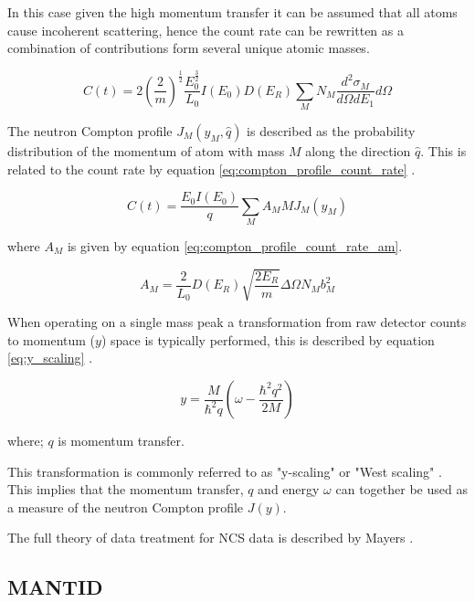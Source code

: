 \documentclass[a4paper]{article}
\begin{document}
In this case given the high momentum transfer it can be assumed that all atoms
cause incoherent scattering, hence the count rate can be rewritten as a
combination of contributions form several unique atomic masses.

\begin{equation}
  \label{eq:countrate_ncs}
  C(t) =
    2\left(\frac{2}{m}\right)^{\frac{1}{2}}
    \frac{E_{0}^{\frac{3}{2}}}{L_{0}}
    I(E_{0}) D(E_{R})
    \sum_{M}
    N_{M} \frac{d^{2}\sigma_{M}}{d\Omega dE_{1}} d\Omega
\end{equation}

The neutron Compton profile $J_{M}(y_{M}, \hat{q})$ is described as the
probability distribution of the momentum of atom with mass $M$ along the
direction $\hat{q}$. This is related to the count rate by equation
\ref{eq:compton_profile_count_rate} \cite{Mayers2010}.

\begin{equation}
  \label{eq:compton_profile_count_rate}
  C(t) =
    \frac{E_{0} I(E_{0})}{q}
    \sum_{M}
    A_{M} M J_{M}(y_{M})
\end{equation}

where $A_{M}$ is given by equation \ref{eq:compton_profile_count_rate_am}.

\begin{equation}
  \label{eq:compton_profile_count_rate_am}
  A_{M} =
    \frac{2}{L_{0}} D(E_{R})
    \sqrt{\frac{2E_{R}}{m}}
    \Delta \Omega N_{M} b_{M}^{2}
\end{equation}

When operating on a single mass peak a transformation from raw detector counts
to momentum ($y$) space is typically performed, this is described by equation
\ref{eq:y_scaling} \cite{Jackson2014}.

\begin{equation}
  \label{eq:y_scaling}
  y =
    \frac{M}{\hbar^{2} q}
    \left(\omega - \frac{\hbar^{2} q^{2}}{2M} \right)
\end{equation}

where; $q$ is momentum transfer.

This transformation is commonly referred to as "y-scaling" or "West scaling"
\cite{West1975}. This implies that the momentum transfer, $q$ and energy
$\omega$ can together be used as a measure of the neutron Compton profile
$J(y)$.

The full theory of data treatment for \gls*{NCS} data is described by Mayers
\cite{Mayers2004}.

\subsection{\gls*{MANTID}}
\end{document}
